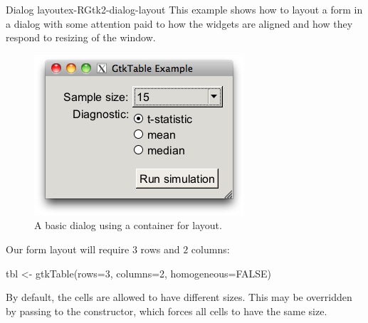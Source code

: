\begin{example}{Dialog layout}{ex-RGtk2-dialog-layout}
This example shows how to layout a form in a dialog with some
attention paid to how the widgets are aligned and how they respond to
resizing of the window.

\begin{figure}
  \centering
  \includegraphics[width=.5\textwidth]{fig-RGtk2-gtktable-example.png}
  \caption{A basic dialog using a  container for layout.}
  \label{fig:RGtk2-dialog-layout}
\end{figure}

Our form layout will require $3$ rows and $2$ columns:
\begin{Schunk}
\begin{Sinput}
 tbl <- gtkTable(rows=3, columns=2, homogeneous=FALSE)
\end{Sinput}
\end{Schunk}
%
By default, the cells are allowed to have different sizes. This may be
overridden by passing  to the constructor,
which forces all cells to have the same size.


\end{example}
